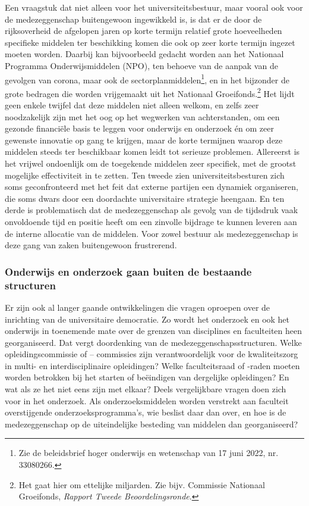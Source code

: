 \documentclass[smallauthor, chapterhaspagenum, nochapterinheader, pagenuminheader,  bigchapnum,medium2, tocpages, garamond, titleinheader]{jote-book}
\begin{document}
	Een vraagstuk dat niet alleen voor het universiteitsbestuur, maar vooral ook voor de medezeggenschap buitengewoon ingewikkeld is, is dat er de door de rijksoverheid de afgelopen jaren op korte termijn relatief grote hoeveelheden specifieke middelen ter beschikking komen die ook op zeer korte termijn ingezet moeten worden. Daarbij kan bijvoorbeeld gedacht worden aan het Nationaal Programma Onderwijsmiddelen (NPO), ten behoeve van de aanpak van de gevolgen van corona, maar ook de sectorplanmiddelen\footnote{Zie de beleidsbrief hoger onderwijs en wetenschap van 17 juni 2022, nr. 33080266.}, en in het bijzonder de grote bedragen die worden vrijgemaakt uit het Nationaal Groeifonds.\footnote{Het gaat hier om ettelijke miljarden. Zie bijv. Commissie Nationaal Groeifonds, \emph{Rapport Tweede Beoordelingsronde}.} Het lijdt geen enkele twijfel dat deze middelen niet alleen welkom, en zelfs zeer noodzakelijk zijn met het oog op het wegwerken van achterstanden, om een gezonde financiële basis te leggen voor onderwijs en onderzoek én om zeer gewenste innovatie op gang te krijgen, maar de korte termijnen waarop deze middelen steeds ter beschikbaar komen leidt tot serieuze problemen. Allereerst is het vrijwel ondoenlijk om de toegekende middelen zeer specifiek, met de grootst mogelijke effectiviteit in te zetten. Ten tweede zien universiteitsbesturen zich soms geconfronteerd met het feit dat externe partijen een dynamiek organiseren, die soms dwars door een doordachte universitaire strategie heengaan. En ten derde is problematisch dat de medezeggenschap als gevolg van de tijdsdruk vaak onvoldoende tijd en positie heeft om een zinvolle bijdrage te kunnen leveren aan de interne allocatie van de middelen. Voor zowel bestuur als medezeggenschap is deze gang van zaken buitengewoon frustrerend.



	\subsubsection{Onderwijs en onderzoek gaan buiten de bestaande structuren}



	Er zijn ook al langer gaande ontwikkelingen die vragen oproepen over de inrichting van de universitaire democratie. Zo wordt het onderzoek en ook het onderwijs in toenemende mate over de grenzen van disciplines en faculteiten heen georganiseerd. Dat vergt doordenking van de medezeggenschapsstructuren. Welke opleidingscommissie of -- commissies zijn verantwoordelijk voor de kwaliteitszorg in multi- en interdisciplinaire opleidingen? Welke faculteitsraad of -raden moeten worden betrokken bij het starten of beëindigen van dergelijke opleidingen? En wat als ze het niet eens zijn met elkaar? Deels vergelijkbare vragen doen zich voor in het onderzoek. Als onderzoeksmiddelen worden verstrekt aan faculteit overstijgende onderzoeksprogramma's, wie beslist daar dan over, en hoe is de medezeggenschap op de uiteindelijke besteding van middelen dan georganiseerd?
\end{document}
